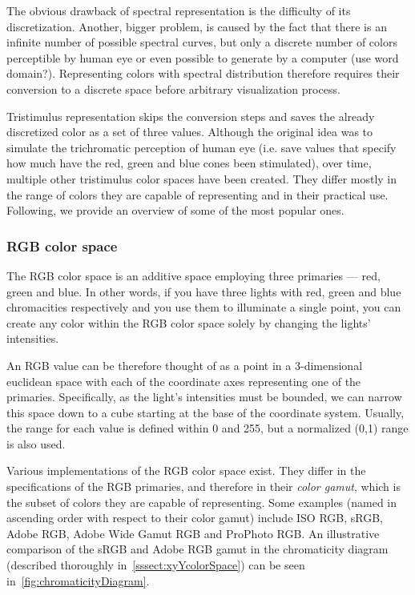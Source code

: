The obvious drawback of spectral representation is the difficulty of its discretization. Another, bigger problem, is caused by the fact that there is an infinite number of possible spectral curves, but only a discrete number of colors perceptible by human eye or even possible to generate by a computer (use word domain?). Representing colors with spectral distribution therefore requires their conversion to a discrete space before arbitrary visualization process.

Tristimulus representation skips the conversion steps and saves the already discretized color as a set of three values. Although the original idea was to simulate the trichromatic perception of human eye (i.e. save values that specify how much have the red, green and blue cones been stimulated), over time, multiple other tristimulus color spaces have been created. They differ mostly in the range of colors they are capable of representing and in their practical use. Following, we provide an overview of some of the most popular ones.

\subsubsection{RGB color space}
The RGB color space is an additive space employing three primaries --- red, green and blue. In other words, if you have three lights with red, green and blue chromacities respectively and you use them to illuminate a single point, you can create any color within the RGB color space solely by changing the lights' intensities. 

An RGB value can be therefore thought of as a point in a 3-dimensional euclidean space with each of the coordinate axes representing one of the primaries. Specifically, as the light's intensities must be bounded, we can narrow this space down to a cube starting at the base of the coordinate system. Usually, the range for each value is defined within 0 and 255, but a normalized (0,1) range is also used.

Various implementations of the RGB color space exist. They differ in the specifications of the RGB primaries, and therefore in their \emph{color gamut}, which is the subset of colors they are capable of representing. Some examples (named in ascending order with respect to their color gamut) include ISO RGB, sRGB, Adobe RGB, Adobe Wide Gamut RGB and ProPhoto RGB. An illustrative comparison of the sRGB and Adobe RGB gamut in the chromaticity diagram (described thoroughly in~\cref{sssect:xyYcolorSpace}) can be seen in~\cref{fig:chromaticityDiagram}.

